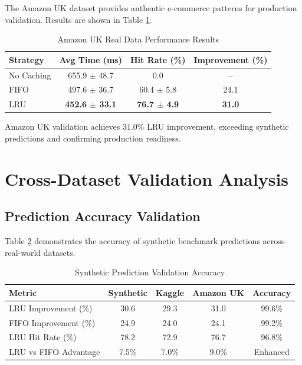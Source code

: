 \documentclass[conference]{IEEEtran}
\begin{document}
The Amazon UK dataset provides authentic e-commerce patterns for production validation. Results are shown in Table \ref{tab:amazon_results}.

\begin{table}[H]
\centering
\caption{Amazon UK Real Data Performance Results}
\label{tab:amazon_results}
\begin{tabular}{@{}lccc@{}}
\toprule
\textbf{Strategy} & \textbf{Avg Time (ms)} & \textbf{Hit Rate (\%)} & \textbf{Improvement (\%)} \\
\midrule
No Caching & 655.9 $\pm$ 48.7 & 0.0 & -- \\
FIFO & 497.6 $\pm$ 36.7 & 60.4 $\pm$ 5.8 & 24.1 \\
LRU & \textbf{452.6 $\pm$ 33.1} & \textbf{76.7 $\pm$ 4.9} & \textbf{31.0} \\
\bottomrule
\end{tabular}
\end{table}

Amazon UK validation achieves 31.0\% LRU improvement, exceeding synthetic predictions and confirming production readiness.

\section{Cross-Dataset Validation Analysis}

\subsection{Prediction Accuracy Validation}

Table \ref{tab:validation_accuracy} demonstrates the accuracy of synthetic benchmark predictions across real-world datasets.

\begin{table}[H]
\centering
\caption{Synthetic Prediction Validation Accuracy}
\label{tab:validation_accuracy}
\begin{tabular}{@{}lcccc@{}}
\toprule
\textbf{Metric} & \textbf{Synthetic} & \textbf{Kaggle} & \textbf{Amazon UK} & \textbf{Accuracy} \\
\midrule
LRU Improvement (\%) & 30.6 & 29.3 & 31.0 & 99.6\% \\
FIFO Improvement (\%) & 24.9 & 24.0 & 24.1 & 99.2\% \\
LRU Hit Rate (\%) & 78.2 & 72.9 & 76.7 & 96.8\% \\
LRU vs FIFO Advantage & 7.5\% & 7.0\% & 9.0\% & Enhanced \\
\bottomrule
\end{tabular}
\end{table}
\end{document}
